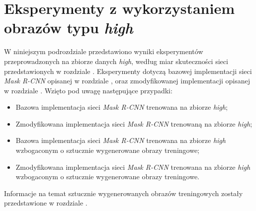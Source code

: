 \section{Eksperymenty z wykorzystaniem obrazów typu \textit{high}}
\label{sec:experymenty_high}
W niniejszym podrozdziale przedstawiono wyniki eksperymentów przeprowadzonych na zbiorze danych \textit{high}, według miar skuteczności sieci przedstawionych w rozdziale .
Eksperymenty dotyczą bazowej implementacji sieci \textit{Mask R-CNN} \cite{matterport-mask-rcnn} opisanej w rozdziale , oraz zmodyfikowanej implementacji opisanej w rozdziale .
 Wzięto pod uwagę następujące przypadki:

\begin{itemize}
 \item Bazowa implementacja sieci \textit{Mask R-CNN} trenowana na zbiorze \textit{high};
 \item Zmodyfikowana implementacja sieci \textit{Mask R-CNN} trenowaną na zbiorze \textit{high};
 \item Bazowa implementacja sieci \textit{Mask R-CNN} trenowana na zbiorze \textit{high} wzbogaconym o sztucznie wygenerowane obrazy treningowe;
 \item Zmodyfikowana implementacja sieci \textit{Mask R-CNN} trenowana na zbiorze \textit{high} wzbogaconym o sztucznie wygenerowane obrazy treningowe.
\end{itemize}

Informacje na temat sztucznie wygenerowanych obrazów treningowych zostały przedstawione w rozdziale .
